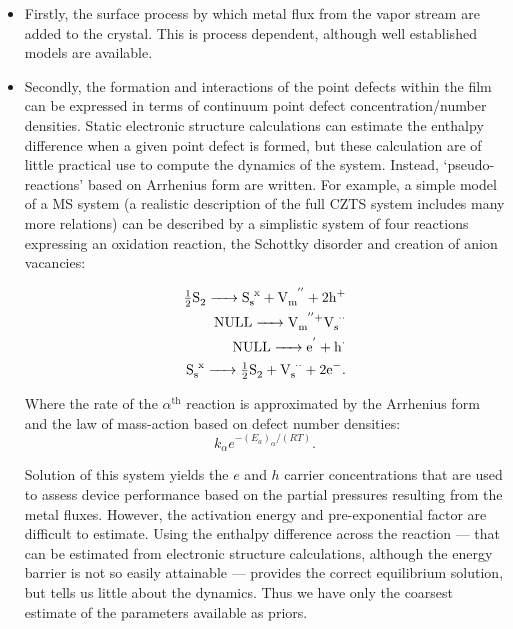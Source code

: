 \documentclass[11pt]{article}
\begin{document}
\begin{itemize}
  \item Firstly, the surface process by which metal flux from the vapor
  stream are added to the crystal. This is process dependent, although
  well established models are available. 

\item Secondly, the formation and interactions of the point defects
  within the film can be expressed in terms of continuum point defect
  concentration/number densities. Static electronic structure
  calculations can estimate the enthalpy difference when a given point
  defect is formed, but these calculation are of little practical use
  to compute the dynamics of the system. Instead, `pseudo-reactions'
  based on Arrhenius form are written. For example, a simple model of a
  MS system (a realistic description of the full CZTS system includes
  many more relations) can be described by a simplistic system of four
  reactions expressing an oxidation reaction, the Schottky disorder
  and creation of anion vacancies:

\begin{eqnarray*}
\ce{ \tfrac{1}{2} S2 -> S_s^x + V_m^{''} + 2 h^+ } \\
\ce{ NULL -> V_m^{''}+ V_s^{$\cdot \cdot$} } \\
\ce{ NULL -> e^' + h^{$\cdot$} } \\
\ce{ S_s^x -> \tfrac{1}{2} S2 + V_s^{$\cdot \cdot$} + 2 e^- }.
\end{eqnarray*}

Where the rate of the $\alpha^{\mathrm{th}}$ reaction is approximated
by the Arrhenius form and the law of mass-action based on defect
number densities:
\begin{equation}
  \label{eq:1}
  k_\alpha e^{-(E_a)_\alpha/(RT)}.
\end{equation}

Solution of this system yields the $e$ and $h$ carrier
concentrations that are used to assess device performance based on the
partial pressures resulting from the metal fluxes. However, the
activation energy and pre-exponential factor are difficult to
estimate. Using the enthalpy difference across the reaction --- that
can be estimated from electronic structure calculations, although the
energy barrier is not so easily attainable --- provides
the correct equilibrium solution, but tells us little about the
dynamics. Thus we have only the coarsest estimate of the parameters
available as priors.


\end{itemize}
\end{document}
